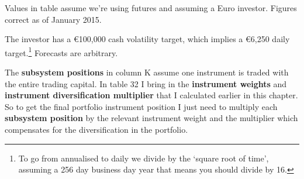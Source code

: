 Values in table assume we're using futures and assuming a Euro investor. Figures correct as of January 2015.

 \begingroup \small \centering
{}
\par \endgroup

The investor has a €100,000 cash volatility target, which implies a €6,250 daily target.\footnote{To go from annualised to daily we divide by the ‘square root of time’, assuming a 256 day business day year that means you should divide by 16.} Forecasts are arbitrary.

The \textbf{subsystem positions} in column K assume one instrument is traded with the entire trading capital. In table 32 I bring in the \textbf{instrument weights} and \textbf{instrument diversification multiplier} that I calculated earlier in this chapter. So to get the final portfolio instrument position I just need to multiply each \textbf{subsystem position} by the relevant instrument weight and the multiplier which compensates for the diversification in the portfolio.

